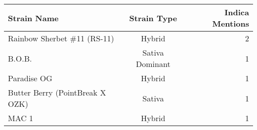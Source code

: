 \begin{tabular}{lcr}
\toprule
Strain Name & Strain Type & Indica Mentions \\
\midrule
Rainbow Sherbet \#11 (RS-11) & Hybrid & 2 \\
B.O.B. & Sativa Dominant & 1 \\
Paradise OG & Hybrid & 1 \\
Butter Berry (PointBreak X OZK) & Sativa & 1 \\
MAC 1 & Hybrid & 1 \\
\bottomrule
\end{tabular}
